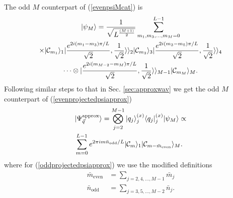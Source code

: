 \documentclass[%
  prx,%
  twocolumn,%
  preprintnumbers,%
  amsmath,%
  amssymb,%
  superscriptaddress%
]{revtex4}
\begin{document}
{%

%














%


The odd $ M $ counterpart of (\ref{evenpsiMcat}) is
%
\begin{multline}
| \psi_M \rangle=\frac{1}{\sqrt{L^{\frac{(M+1)}{2}}}}\sum_{m_1,m_3,\ldots,m_M=0}^{L-1} \\
\times | {\cal C}_{m_1}  \rangle_1  |\frac{e^{2 i(m_{1}-m_{3})\pi/L }}{\sqrt{2}},\frac{1}{\sqrt{2}}\rangle\rangle_2 | {\cal C}_{m_3} \rangle_3
|\frac{e^{2 i(m_{3}-m_{5})\pi/L }}{\sqrt{2}},\frac{1}{\sqrt{2}}\rangle\rangle_4  \\
\dots \otimes |\frac{e^{2 i(m_{M-2}-m_{M})\pi/L }}{\sqrt{2}},\frac{1}{\sqrt{2}}\rangle\rangle_{M-1} | {\cal C}_{m_{M}}  \rangle_{M} .
\label{oddpsiMcat}
\end{multline}
%
Following similar steps to that in Sec. \ref{sec:approxwav} we get the odd $ M $ counterpart of (\ref{evenprojectedpsiapprox})
%
\begin{align}
& | \Psi_{\vec{q}}^{\text{approx}} \rangle =  \bigotimes_{j=2}^{M-1}  |q_j \rangle_j^{(x)} \langle q_j |_j^{(x)}  |\psi_M \rangle \propto \nonumber \\
& \sum_{m=0}^{L-1} e^{2 \pi i m \bar{n}_{\text{odd}}/L } | {\cal C}_{m}  \rangle_1 | {\cal C}_{m - \bar{m}_{\text{even}}}  \rangle_M  .  \label{oddprojectedpsiapprox}
\end{align}
%
where for (\ref{oddprojectedpsiapprox}) we use the modified definitions
%
\begin{align}
\bar{m}_\text{even} & =
\sum_{j=2,4, \dots, M-1} \bar{m}_j  \nonumber \\
\bar{n}_{\text{odd}} & = \sum_{j=3,5,\dots, M-2} \bar{n}_j  .
\end{align}


}
\end{document}
